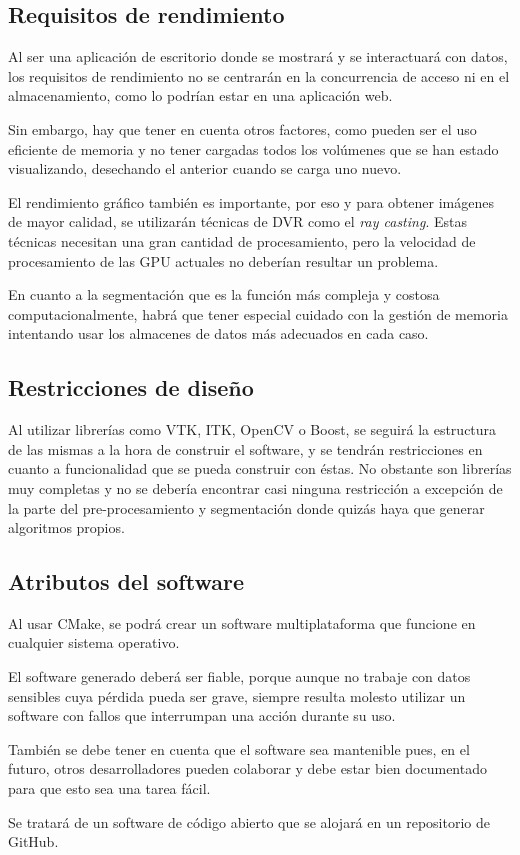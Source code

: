 \subsection{Requisitos de rendimiento}

Al ser una aplicación de escritorio donde se mostrará y se interactuará con datos, los requisitos de rendimiento no se centrarán en la concurrencia de acceso ni en el almacenamiento, como lo podrían estar en una aplicación web.

Sin embargo, hay que tener en cuenta otros factores, como pueden ser el uso eficiente de memoria y no tener cargadas todos los volúmenes que se han estado visualizando, desechando el anterior cuando se carga uno nuevo.

El rendimiento gráfico también es importante, por eso y para obtener imágenes de mayor calidad, se utilizarán técnicas de DVR como el \textit{ray casting}. Estas técnicas necesitan una gran cantidad de procesamiento, pero la velocidad de procesamiento de las GPU actuales no deberían resultar un problema.

En cuanto a la segmentación que es la función más compleja y costosa computacionalmente, habrá que tener especial cuidado con la gestión de memoria intentando usar los almacenes de datos más adecuados en cada caso.

\subsection{Restricciones de diseño}

Al utilizar librerías como VTK, ITK, OpenCV o Boost, se seguirá la estructura de las mismas a la hora de construir el software, y se tendrán restricciones en cuanto a funcionalidad que se pueda construir con éstas. No obstante son librerías muy completas y no se debería encontrar casi ninguna restricción a excepción de la parte del pre-procesamiento y segmentación donde quizás haya que generar algoritmos propios.

\subsection{Atributos del software}

Al usar CMake, se podrá crear un software multiplataforma que funcione en cualquier sistema operativo.

El software generado deberá ser fiable, porque aunque no trabaje con datos sensibles cuya pérdida pueda ser grave, siempre resulta molesto utilizar un software con fallos que interrumpan una acción durante su uso.

También se debe tener en cuenta que el software sea mantenible pues, en el futuro, otros desarrolladores pueden colaborar y debe estar bien documentado para que esto sea una tarea fácil.

Se tratará de un software de código abierto que se alojará en un repositorio de GitHub.